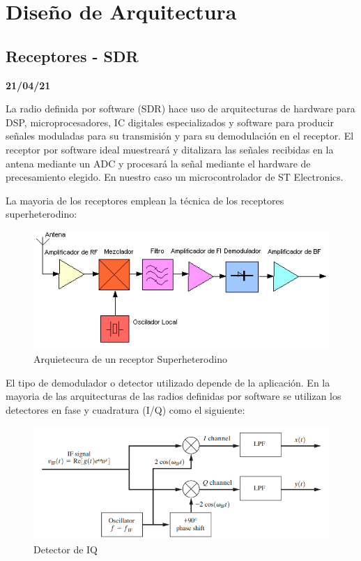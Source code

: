 \documentclass[a4paper,12pt]{report} %
\begin{document}
\chapter{Diseño de Arquitectura}

\section{Receptores - SDR} 

\textbf{21/04/21}

La radio definida por software (SDR)  hace uso de arquitecturas de hardware para DSP, microprocesadores, IC digitales especializados y software para producir señales moduladas para su transmisión y para su demodulación en el receptor. El receptor por software ideal muestreará y ditalizara las señales recibidas en la antena mediante un ADC y procesará la señal mediante el hardware de precesamiento elegido. En nuestro caso un microcontrolador de ST Electronics.

La mayoria de los receptores emplean la técnica de los receptores superheterodino: 

\begin{figure}[H]
	\centering
	\includegraphics[scale=0.7]{Imagenes/Arquitectura/superhetero}
	\caption{Arquietecura de un receptor Superheterodino}
	\label{super}
\end{figure}

El tipo de demodulador o detector utilizado depende de la aplicación. En la mayoria de las arquitecturas de las radios definidas por software se utilizan los detectores en fase y cuadratura (I/Q) como el siguiente: 

\begin{figure}
	\centering
	\includegraphics[scale=0.6]{Imagenes/Arquitectura/iq}
	\caption{Detector de IQ}
	\label{iq}
\end{figure}
\end{document}
